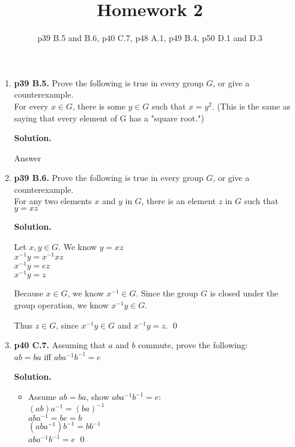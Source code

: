\documentclass[11pt]{article}
\begin{document}
\title{Homework 2}
\date{p39 B.5 and B.6, p40 C.7, p48 A.1, p49 B.4, p50 D.1 and D.3}
\maketitle

\thispagestyle{fancy}  
\pagestyle{fancy}      

\begin{enumerate}

\item {\bfseries p39 B.5.} Prove the following is true in every group $G$, or give a counterexample. \\
  For every $x \in G$, there is some $y \in G$ such that $x = y^2$. (This is the same as saying that every element of G has a "square root.")
  
  {\bfseries Solution.}
  
  Answer \\
 
\item {\bfseries p39 B.6.} Prove the following is true in every group $G$, or give a counterexample. \\
  For any two elements $x$ and $y$ in $G$, there is an element $z$ in $G$ such that $y = xz$
  
  {\bfseries Solution.}
  
  Let $x, y \in G$. We know $y = xz$ \\
  $x^{-1}y = x^{-1}xz$ \\
  $x^{-1}y = ez$ \\
  $x^{-1}y = z$
  
  Because $x \in G$, we know $x^{-1} \in G$. Since the group $G$ is closed under the group operation, we know $x^{-1}y \in G$.
  
  Thus $z \in G$, since $x^{-1}y \in G$ and $x^{-1}y = z$. \qed \\

\item {\bfseries p40 C.7.} Assuming that $a$ and $b$ commute, prove the following: \\
  $ab = ba$ iff $aba^{-1}b^{-1} = e$
  
  {\bfseries Solution.}
  
  \begin{itemize}
  
	  \item Assume $ab = ba$, show $aba^{-1}b^{-1} = e$: \\
	  $(ab)a^{-1} = (ba)^{-1}$ \\
	  $aba^{-1} = be = b$ \\
	  $(aba^{-1})b^{-1} = bb^{-1}$ \\
	  $aba^{-1}b^{-1} = e$ \qed \\
	  

\end{itemize}
\end{enumerate}
\end{document}
